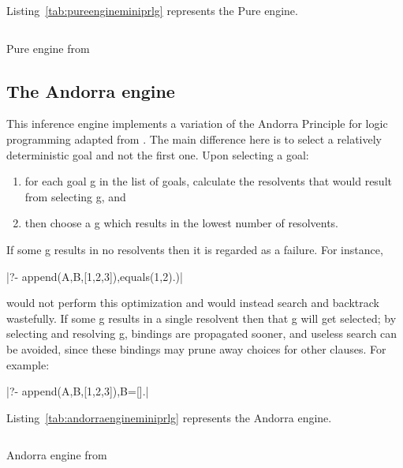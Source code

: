\documentclass[thesis-solanki.tex]{files}
\begin{document}
Listing~\ref{tab:pureengineminiprlg} represents the Pure engine.

\begin{code-list}[H]
\begin{singlespace}
\inputminted[linenos, firstline=26, lastline=46]{haskell}{haskell-proto3-absurd-silicon.hs}
\end{singlespace}
\caption{Pure engine from  \cite{website:mini-prolog-hugs98}}
\label{tab:pureengineminiprlg}
\end{code-list}

\subsection{The Andorra engine}
This inference engine implements a variation of the Andorra Principle for logic programming adapted from
\cite{haridi1990kernel}.
The main difference here is to select a relatively deterministic goal and not the first one.
Upon selecting a goal:
\begin{enumerate}
\item
  for each goal g in the list of goals, calculate the resolvents that would result from selecting g, and
\item
  then choose a g which results in the lowest number of resolvents.
\end{enumerate}

If some g results in no resolvents then it is regarded as a failure. For instance,

|?- append(A,B,[1,2,3]),equals(1,2).)|

 would not perform this optimization and would instead search and backtrack wastefully.
If some g results in a single resolvent then that g will get selected; by selecting and resolving g, bindings are
propagated sooner, and useless search can be avoided, since these bindings may prune away choices for other
clauses.
For example:

|?- append(A,B,[1,2,3]),B=[].|

\noindent Listing~\ref{tab:andorraengineminiprlg} represents the Andorra engine.

\begin{code-list}[H]
\begin{singlespace}
\inputminted[linenos, firstline=29, lastline=64]{haskell}{haskell-proto3-diatomic-unbank.hs}
\end{singlespace}
\caption{Andorra engine from  \cite{website:mini-prolog-hugs98}}
\label{tab:andorraengineminiprlg}
\end{code-list}
\end{document}
